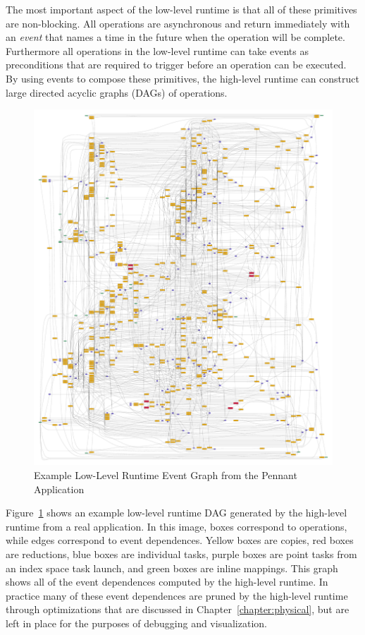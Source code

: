 The most important aspect of the low-level runtime is
that all of these primitives are non-blocking.
All operations are asynchronous and return
immediately with an {\em event} that names a time in the
future when the operation will be complete.  Furthermore
all operations in the low-level runtime can take
events as preconditions that are required to trigger before 
an operation can be executed. By using events to compose
these primitives, the high-level runtime can construct
large directed acyclic graphs (DAGs) of operations.

\begin{figure}[ht!]
\centering
\includegraphics[scale=0.2]{figs/event_graph_example.pdf}
\caption{Example Low-Level Runtime Event Graph from the Pennant Application\label{fig:event_graph_example}}
\end{figure}

Figure~\ref{fig:event_graph_example} shows an example
low-level runtime DAG generated by the high-level runtime 
from a real application. In this image, boxes correspond 
to operations, while edges correspond to event dependences. 
Yellow boxes are copies, red boxes are reductions, 
blue boxes are individual tasks, purple boxes are point 
tasks from an index space task launch, and green boxes 
are inline mappings. This graph shows all of the event
dependences computed by the high-level runtime.
In practice many of these event dependences are pruned
by the high-level runtime through optimizations that
are discussed in Chapter~\ref{chapter:physical}, but
are left in place for the purposes of debugging and
visualization.

